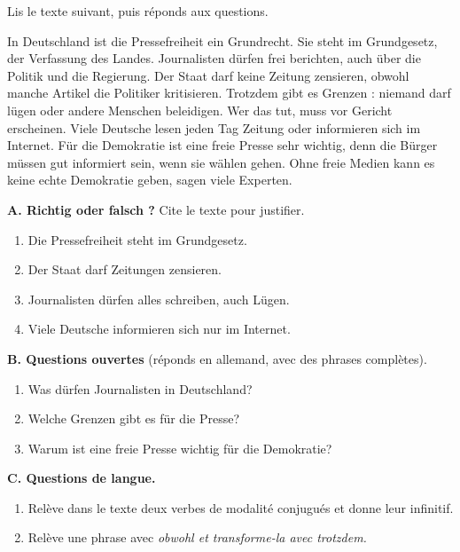 \documentclass[11pt]{article}
\newcommand{\all}[1]{\ifmmode\text{\textit{#1}}\else\begingroup\selectlanguage{ngerman}\itshape #1\endgroup\fi}
\begin{document}
\begin{exercice}
Lis le texte suivant, puis réponds aux questions.

\begin{textebox}
In Deutschland ist die Pressefreiheit ein Grundrecht. Sie steht im Grundgesetz, der Verfassung des Landes. Journalisten dürfen frei berichten, auch über die Politik und die Regierung. Der Staat darf keine Zeitung zensieren, obwohl manche Artikel die Politiker kritisieren. Trotzdem gibt es Grenzen : niemand darf lügen oder andere Menschen beleidigen. Wer das tut, muss vor Gericht erscheinen. Viele Deutsche lesen jeden Tag Zeitung oder informieren sich im Internet. Für die Demokratie ist eine freie Presse sehr wichtig, denn die Bürger müssen gut informiert sein, wenn sie wählen gehen. Ohne freie Medien kann es keine echte Demokratie geben, sagen viele Experten.
\end{textebox}

\textbf{A. Richtig oder falsch ?} Cite le texte pour justifier.
\begin{enumerate}
\item Die Pressefreiheit steht im Grundgesetz.
\item Der Staat darf Zeitungen zensieren.
\item Journalisten dürfen alles schreiben, auch Lügen.
\item Viele Deutsche informieren sich nur im Internet.
\end{enumerate}

\textbf{B. Questions ouvertes} (réponds en allemand, avec des phrases complètes).
\begin{enumerate}
\item Was dürfen Journalisten in Deutschland?
\item Welche Grenzen gibt es für die Presse?
\item Warum ist eine freie Presse wichtig für die Demokratie?
\end{enumerate}

\textbf{C. Questions de langue.}
\begin{enumerate}
\item Relève dans le texte deux verbes de modalité conjugués et donne leur infinitif.
\item Relève une phrase avec \all{obwohl} et transforme-la avec \all{trotzdem}.
\end{enumerate}
\end{exercice}
\end{document}
